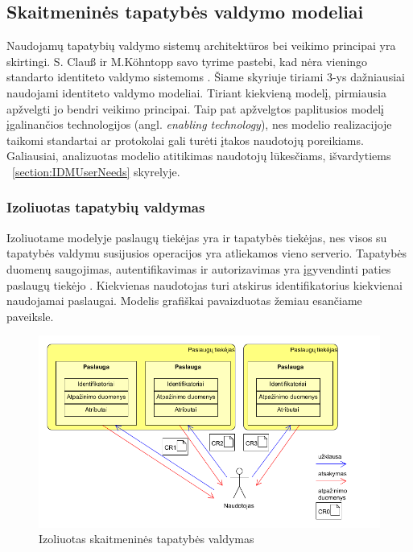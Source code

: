 \subsection{Skaitmeninės tapatybės valdymo modeliai}

Naudojamų tapatybių valdymo sistemų architektūros bei veikimo principai yra skirtingi. S. Clauß ir M.Köhntopp savo tyrime pastebi,
kad nėra vieningo standarto identiteto valdymo sistemoms \cite{Claus2001}. Šiame skyriuje tiriami 3-ys dažniausiai naudojami identiteto valdymo
modeliai. Tiriant kiekvieną modelį, pirmiausia apžvelgti jo bendri veikimo principai. Taip pat apžvelgtos paplitusios modelį įgalinančios technologijos
(angl. \textit{enabling technology}),
nes modelio realizacijoje taikomi standartai ar protokolai gali turėti įtakos naudotojų poreikiams. Galiausiai, analizuotas modelio atitikimas naudotojų lūkesčiams,
išvardytiems ~\ref{section:IDMUserNeeds} skyrelyje.

\subsubsection{Izoliuotas tapatybių valdymas}


Izoliuotame modelyje paslaugų tiekėjas yra ir tapatybės tiekėjas, nes visos su tapatybės valdymu
susijusios operacijos yra atliekamos vieno serverio. Tapatybės duomenų saugojimas, autentifikavimas
ir autorizavimas yra įgyvendinti paties paslaugų tiekėjo \cite{Cao2010}. Kiekvienas naudotojas turi atskirus identifikatorius
kiekvienai naudojamai paslaugai. Modelis grafiškai pavaizduotas žemiau esančiame paveiksle.

\begin{figure}[H]
    \centering
    \includegraphics[scale=0.65]{img/IsolatedModel}
    \caption{Izoliuotas skaitmeninės tapatybės valdymas \cite{Cao2010}}
\end{figure}

